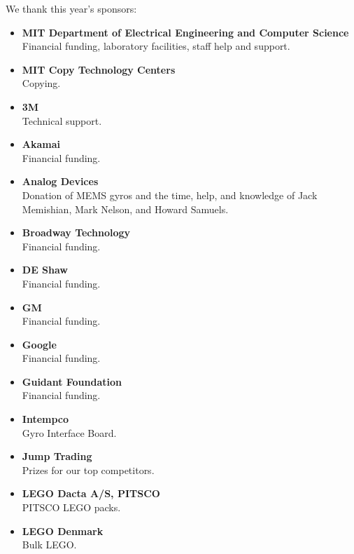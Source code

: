 \documentclass[12pt]{book}
\begin{document}
\beforepreface

We thank this year's sponsors:
\begin{itemize}

\item {\bf MIT Department of Electrical Engineering and Computer Science}\\
Financial funding, laboratory facilities, staff help and support.

\item {\bf MIT Copy Technology Centers}\\
Copying.

\item {\bf 3M}\\
Technical support.

\item {\bf Akamai}\\
Financial funding.

\item {\bf Analog Devices}\\
Donation of MEMS gyros and the time, help, and knowledge of Jack Memishian, Mark Nelson, and Howard Samuels.

\item {\bf Broadway Technology}\\
Financial funding.

\item {\bf DE Shaw}\\
Financial funding.

\item {\bf GM}\\
Financial funding.

\item {\bf Google}\\
Financial funding.

\item {\bf Guidant Foundation}\\
Financial funding.

\item {\bf Intempco}\\
Gyro Interface Board.

\item {\bf Jump Trading}\\
Prizes for our top competitors.

\item {\bf LEGO Dacta A/S, PITSCO}\\
PITSCO LEGO packs.

\item {\bf LEGO Denmark}\\
Bulk LEGO.


\end{itemize}
\end{document}
